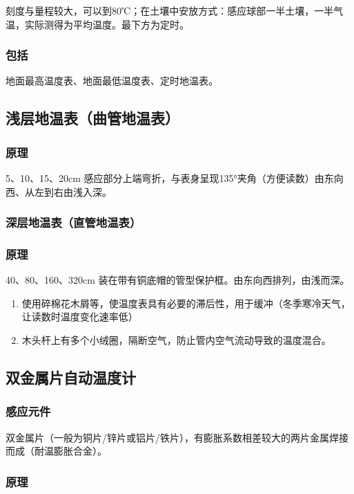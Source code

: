 \documentclass[UTF8,11pt]{ctexbook}
\begin{document}
刻度与量程较大，可以到80℃；在土壤中安放方式：感应球部一半土壤，一半气温，实际测得为平均温度。最下方为定时。

\subsubsection{包括}

地面最高温度表、地面最低温度表、定时地温表。

\subsection{浅层地温表（曲管地温表）}

\subsubsection{原理}

5、10、15、20cm 感应部分上端弯折，与表身呈现135°夹角（方便读数）由东向西、从左到右由浅入深。

\subsubsection{深层地温表（直管地温表）}

\subsubsection{原理}

40、80、160、320cm 装在带有铜底帽的管型保护框。由东向西排列，由浅而深。
\begin{enumerate}
    \item 使用碎棉花木屑等，使温度表具有必要的滞后性，用于缓冲（冬季寒冷天气，让读数时温度变化速率低）
    \item 木头杆上有多个小绒圈，隔断空气，防止管内空气流动导致的温度混合。
\end{enumerate}

\subsection{双金属片自动温度计}

\subsubsection{感应元件}

双金属片（一般为铜片/锌片或铝片/铁片），有膨胀系数相差较大的两片金属焊接而成（耐温膨胀合金）。

\subsubsection{原理}
\end{document}
